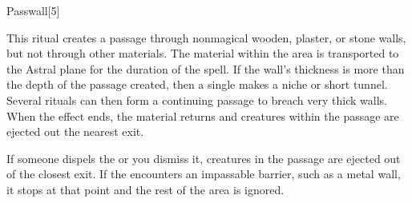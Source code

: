 \begin{spellsection}{Passwall}[5]
    \begin{spellheader}
    \end{spellheader}
    \begin{spellcontent}
        \begin{spelltargetinginfo}
        \end{spelltargetinginfo}
        \begin{spelleffects}
            \spelleffect This ritual creates a passage through nonmagical wooden, plaster, or stone walls, but not through other materials. The material within the area is transported to the Astral plane for the duration of the spell. If the wall's thickness is more than the depth of the passage created, then a single  makes a niche or short tunnel. Several  rituals can then form a continuing passage to breach very thick walls. When the effect ends, the material returns and creatures within the passage are ejected out the nearest exit.
            \spelldur \durext \dismissable
        \end{spelleffects}
    \end{spellcontent}
    \begin{spellfooter}
        \spellnotes If someone dispels the  or you dismiss it, creatures in the passage are ejected out of the closest exit. If the  encounters an impassable barrier, such as a metal wall, it stops at that point and the rest of the area is ignored.
    \end{spellfooter}
    \begin{spellaugments}
    \end{spellaugments}
\end{spellsection}

